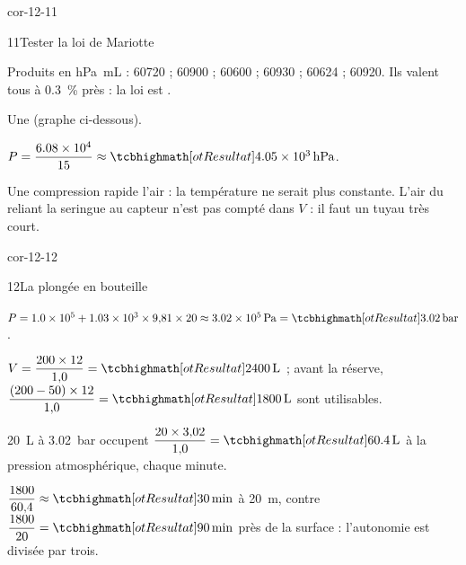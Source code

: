 \begin{blocLivre}{cor-12-11}
\begin{corrige}{11}{Tester la loi de Mariotte}
\begin{questions}
\item Produits en \unit{hPa.mL} : \num{60720} ; \num{60900} ; \num{60600} ; \num{60930} ; \num{60624} ; \num{60920}. Ils valent tous  à \qty{0,3}{\percent} près : la loi
est .
\item Une  (graphe ci-dessous).
\item $P=\dfrac{\num{6,08e4}}{15}\approx\res{\qty{4,05e3}{hPa}}$.
\item Une compression rapide  l'air : la température ne serait plus constante. L'air du  reliant la seringue au
capteur n'est pas compté dans $V$ : il faut un tuyau très court.
\end{questions}
\end{corrige}
\end{blocLivre}
\begin{blocLivre}{cor-12-12}
\begin{corrige}{12}{La plongée en bouteille}
\begin{questions}
\item $P=\num{1,0e5}+\num{1,03e3}\times9{,}81\times20\approx\qty{3,02e5}{Pa}=\res{\qty{3,02}{bar}}$.
\item $V=\dfrac{200\times12}{1{,}0}=\res{\qty{2400}{L}}$ ; avant la réserve, $\dfrac{(200-50)\times12}{1{,}0}=\res{\qty{1800}{L}}$ sont utilisables.
\item \qty{20}{L} à \qty{3,02}{bar} occupent $\dfrac{20\times3{,}02}{1{,}0}=\res{\qty{60,4}{L}}$ à la pression atmosphérique, chaque minute.
\item $\dfrac{1800}{60{,}4}\approx\res{\qty{30}{min}}$ à \qty{20}{m}, contre $\dfrac{1800}{20}=\res{\qty{90}{min}}$ près de la surface : l'autonomie est divisée par trois.
\end{questions}
\end{corrige}
\end{blocLivre}

